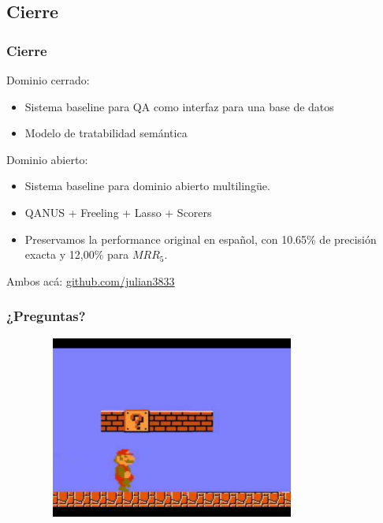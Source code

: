 \documentclass{beamer}
\begin{document}
  \subsection*{Cierre}



\begin{frame}
\frametitle{Cierre}
  

  Dominio cerrado:
  \begin{itemize}
    \item Sistema baseline para QA como interfaz para una base de datos
    \item Modelo de tratabilidad semántica
  \end{itemize}
\bigskip
  Dominio abierto:
  \begin{itemize}
    \item Sistema baseline para dominio abierto multilingüe.
    \item QANUS + Freeling + Lasso + Scorers
    \item Preservamos la performance original en español, con 10.65\% de precisión exacta y 12,00\% para $MRR_5$.
  \end{itemize}

\medskip

Ambos acá: \url{github.com/julian3833}

\end{frame}


  \begin{frame}
    \frametitle{¿Preguntas?}
      \begin{figure}
        \includegraphics[width=9cm,height=6cm]{graficos/qmark2.pdf}
      \end{figure}
    \end{frame}


\end{document}
